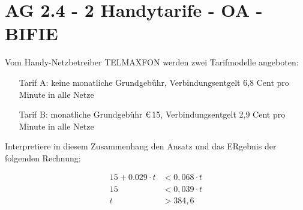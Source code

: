 \section{AG 2.4 - 2 Handytarife  - OA - BIFIE}

\begin{beispiel}[AG 2.4]{1} %
Vom Handy-Netzbetreiber TELMAXFON werden zwei Tarifmodelle angeboten: \\
\begin{itemize}
	\item[Tarif A:] keine monatliche Grundgebühr,
 Verbindungsentgelt 6,8 Cent pro Minute in alle Netze
\item[Tarif B:] monatliche Grundgebühr \euro\,15,
 Verbindungsentgelt 2,9 Cent pro Minute in alle Netze
\end{itemize}

Interpretiere in diesem Zusammenhang den Ansatz und das ERgebnis der folgenden Rechnung:

\begin{align*}
15 + 0.029\cdot t &< 0,068\cdot t \\
15 &< 0,039\cdot t \\
t&>384,6
\end{align*}

\end{beispiel}